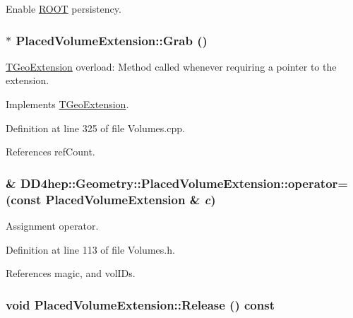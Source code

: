 Enable \hyperlink{namespace_r_o_o_t}{ROOT} persistency. \hypertarget{class_d_d4hep_1_1_geometry_1_1_placed_volume_extension_aa5261b49a18fba980e00d96161db3855}{
\subsubsection[{Grab}]{ $\ast$ PlacedVolumeExtension::Grab ()}}
\label{class_d_d4hep_1_1_geometry_1_1_placed_volume_extension_aa5261b49a18fba980e00d96161db3855}


\hyperlink{class_t_geo_extension}{TGeoExtension} overload: Method called whenever requiring a pointer to the extension. 

Implements \hyperlink{class_t_geo_extension_addd8a323d93527519b94e2db3acbf9d5}{TGeoExtension}.

Definition at line 325 of file Volumes.cpp.

References refCount.\hypertarget{class_d_d4hep_1_1_geometry_1_1_placed_volume_extension_a946b4a4989ea4116a396dffd3886dbd0}{
\subsubsection[{operator=}]{\& DD4hep::Geometry::PlacedVolumeExtension::operator= (const {\bf PlacedVolumeExtension} \& {\em c})}}
\label{class_d_d4hep_1_1_geometry_1_1_placed_volume_extension_a946b4a4989ea4116a396dffd3886dbd0}


Assignment operator. 

Definition at line 113 of file Volumes.h.

References magic, and volIDs.\hypertarget{class_d_d4hep_1_1_geometry_1_1_placed_volume_extension_a92e8b1e394a8aa6dd5ccb94f30c58318}{
\subsubsection[{Release}]{\setlength{\rightskip}{0pt plus 5cm}void PlacedVolumeExtension::Release () const}}
\label{class_d_d4hep_1_1_geometry_1_1_placed_volume_extension_a92e8b1e394a8aa6dd5ccb94f30c58318}



